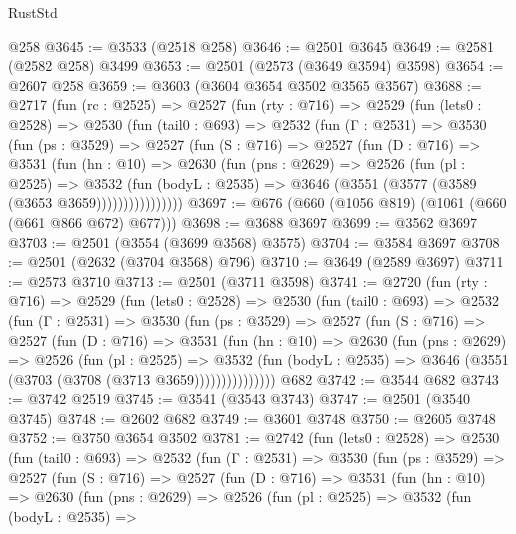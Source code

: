 \begin{lexlean}{RustStd}
\begin{coremodule}
{\begin{coremodule}
{{{{{{{{{{{{{{{{{{{{    @258
@3645 := @3533 (@2518 @258)
@3646 := @2501 @3645
@3649 := @2581 (@2582 @258) @3499
@3653 := @2501 (@2573 (@3649 @3594) @3598)
@3654 := @2607 @258
@3659 := @3603 (@3604 @3654 @3502 @3565 @3567)
@3688 := @2717
    (fun (rc : @2525) =>
    @2527
      (fun (rty : @716) =>
      @2529
        (fun (lets0 : @2528) =>
        @2530
          (fun (tail0 : @693) =>
          @2532
            (fun (Γ : @2531) =>
            @3530
              (fun (ps : @3529) =>
              @2527
                (fun (S : @716) =>
                @2527
                  (fun (D : @716) =>
                  @3531
                    (fun (hn : @10) =>
                    @2630
                      (fun (pns : @2629) =>
                      @2526
                        (fun (pl : @2525) =>
                        @3532
                          (fun (bodyL : @2535) =>
                          @3646 (@3551 (@3577 (@3589 (@3653 @3659))))))))))))))))
@3697 := @676 (@660 (@1056 @819) (@1061 (@660 (@661 @866 @672) @677)))
@3698 := @3688 @3697
@3699 := @3562 @3697
@3703 := @2501 (@3554 (@3699 @3568) @3575)
@3704 := @3584 @3697
@3708 := @2501 (@2632 (@3704 @3568) @796)
@3710 := @3649 (@2589 @3697)
@3711 := @2573 @3710
@3713 := @2501 (@3711 @3598)
@3741 := @2720
    (fun (rty : @716) =>
    @2529
      (fun (lets0 : @2528) =>
      @2530
        (fun (tail0 : @693) =>
        @2532
          (fun (Γ : @2531) =>
          @3530
            (fun (ps : @3529) =>
            @2527
              (fun (S : @716) =>
              @2527
                (fun (D : @716) =>
                @3531
                  (fun (hn : @10) =>
                  @2630
                    (fun (pns : @2629) =>
                    @2526
                      (fun (pl : @2525) =>
                      @3532
                        (fun (bodyL : @2535) =>
                        @3646 (@3551 (@3703 (@3708 (@3713 @3659)))))))))))))))
    @682
@3742 := @3544 @682
@3743 := @3742 @2519
@3745 := @3541 (@3543 @3743)
@3747 := @2501 (@3540 @3745)
@3748 := @2602 @682
@3749 := @3601 @3748
@3750 := @2605 @3748
@3752 := @3750 @3654 @3502
@3781 := @2742
    (fun (lets0 : @2528) =>
    @2530
      (fun (tail0 : @693) =>
      @2532
        (fun (Γ : @2531) =>
        @3530
          (fun (ps : @3529) =>
          @2527
            (fun (S : @716) =>
            @2527
              (fun (D : @716) =>
              @3531
                (fun (hn : @10) =>
                @2630
                  (fun (pns : @2629) =>
                  @2526
                    (fun (pl : @2525) =>
                    @3532
                      (fun (bodyL : @2535) =>
}}}}}}}}}}}}}}}}}}}}
\end{coremodule}}
\end{coremodule}
\end{lexlean}

